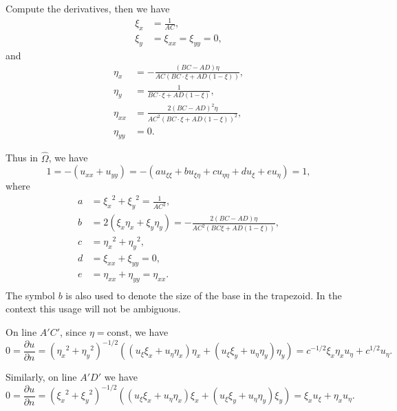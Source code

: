\documentclass{assignment}[2019/10/15]
\newcommand{\lr}[3]{\left#1#3\right#2}
\newcommand{\Oh}{\hat{\Omega}}
\newcommand{\ux}{{u_\xi}}
\newcommand{\ue}{{u_\eta}}
\newcommand{\uxx}{{u_{\xi\xi}}}
\newcommand{\uxe}{{u_{\xi\eta}}}
\newcommand{\uee}{{u_{\eta\eta}}}
\begin{document}
    Compute the derivatives, then we have
    \begin{equation}
        \begin{aligned}
            \xi_x &= \frac{1}{AC},\\
            \xi_y &= \xi_{xx} = \xi_{yy} = 0,
        \end{aligned}
    \end{equation}
    and
    \begin{equation}
        \begin{aligned}
            \eta_x &= -\frac{(BC-AD)\eta}{AC(BC\cdot\xi + AD(1-\xi))},\\
            \eta_y &= \frac{1}{BC\cdot\xi+AD(1-\xi)},\\
            \eta_{xx} &= \frac{2(BC-AD)^2\eta}{AC^2(BC\cdot\xi+AD(1-\xi))^2},\\
            \eta_{yy} &= 0.
        \end{aligned}
    \end{equation}

    Thus in $\Oh$, we have
    \begin{equation}
        1 = -(u_{xx} + u_{yy}) = -(a\uxx+b\uxe+c\uee+d\ux+e\ue) = 1,
    \end{equation}
    where
    \begin{equation}
        \begin{aligned}
            a &= {\xi_x}^2+{\xi_y}^2 = \frac{1}{AC^2},\\
            b &= 2(\xi_x\eta_x+\xi_y\eta_y)=-\frac{2(BC-AD)\eta}{AC^2(BC\xi+AD(1-\xi))},\\
            c &= {\eta_x}^2+{\eta_y}^2,\\
            d &= \xi_{xx} + \xi_{yy} = 0,\\
            e &= \eta_{xx} + \eta_{yy} = \eta_{xx}.\\
        \end{aligned}
    \end{equation}
    The symbol $b$ is also used to denote the size of the base in the trapezoid. In the context this usage will not be ambiguous.

    On line $A'C'$, since $\eta = \text{const}$, we have
    \begin{equation}
        0=\frac{\partial u}{\partial n} = \left({\eta_x}^2+{\eta_y}^2\right)^{-1/2}\lr(){(\ux\xi_x+\ue\eta_x)\eta_x+(\ux\xi_y+\ue\eta_y)\eta_y}=c^{-1/2}\xi_x\eta_x\ue+c^{1/2}\ue.
    \end{equation}

    Similarly, on line $A'D'$ we have
    \begin{equation}
        0=\frac{\partial u}{\partial n} = \left({\xi_x}^2+{\xi_y}^2\right)^{-1/2}\lr(){(\ux\xi_x+\ue\eta_x)\xi_x+(\ux\xi_y+\ue\eta_y)\xi_y}=\xi_x\ux+\eta_x\ue.
    \end{equation}
\end{document}
